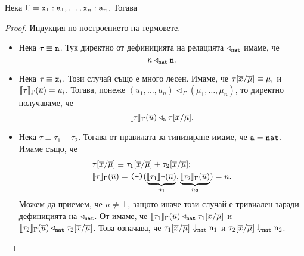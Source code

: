 \begin{framed}
  \begin{lemma}\label{lem:pcf:fundamental}
    Нека $\Gamma = \vv{x}_1:\vv{a}_1,\dots,\vv{x}_n:\vv{a}_n$. Тогава
    \begin{prooftree}
    \end{prooftree}
  \end{lemma}  
\end{framed}
\begin{proof}
  Индукция по построението на термовете.
  \begin{itemize}
  \item
    Нека $\tau \equiv \vv{n}$. Тук директно от дефиницията на релацията $\triangleleft_{\vv{nat}}$ имаме, че
    \[n \triangleleft_{\vv{nat}} \vv{n}.\]
  \item
    Нека $\tau \equiv \vv{x}_i$. Този случай също е много лесен.
    Имаме, че $\tau[\ov{x}/\ov{\mu}] \equiv \mu_i$ и $\val{\tau}_\Gamma(\ov{u}) = u_i$.
    Тогава, понеже $(u_1,\dots,u_n) \triangleleft_\Gamma (\mu_1,\dots,\mu_n)$,
    то директно получаваме, че
    \[\val{\tau}_\Gamma(\ov{u}) \triangleleft_{\vv{a}} \tau[\ov{x}/\ov{\mu}].\]
  \item
    Нека $\tau \equiv \tau_1 + \tau_2$. Тогава от правилата за типизиране имаме, че $\vv{a} = \vv{nat}$. Имаме също, че
    \begin{align*}
      & \tau[\ov{x}/\ov{\mu}] \equiv \tau_1[\ov{x}/\ov{\mu}] + \tau_2[\ov{x}/\ov{\mu}];\\
      & \val{\tau}_\Gamma(\ov{u}) = \plus(\underbrace{\val{\tau_1}_\Gamma(\ov{u})}_{n_1},\underbrace{\val{\tau_2}_\Gamma(\ov{u})}_{n_2}) = n.
    \end{align*}
    Можем да приемем, че $n \neq \bot$, защото иначе този случай е тривиален заради дефиницията на $\triangleleft_{\vv{nat}}$.
    От \IndHyp имаме, че $\val{\tau_1}_\Gamma(\ov{u}) \triangleleft_{\vv{nat}} \tau_1[\ov{x}/\ov{\mu}]$
    и $\val{\tau_2}_\Gamma(\ov{u}) \triangleleft_{\vv{nat}} \tau_2[\ov{x}/\ov{\mu}]$.
    Това означава, че $\tau_1[\ov{x}/\ov{\mu}] \Downarrow_{\vv{nat}} \vv{n}_1$ и $\tau_2[\ov{x}/\ov{\mu}] \Downarrow_{\vv{nat}}
    \vv{n}_2$.

\end{itemize}
\end{proof}
